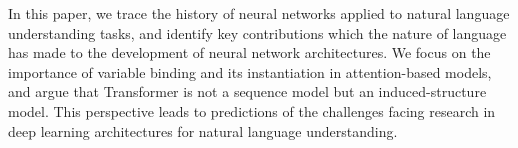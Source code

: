 In this paper, we trace the history of neural networks applied to natural language understanding tasks, and identify key contributions which the nature of language has made to the development of neural network architectures.  We focus on the importance of variable binding and its instantiation in attention-based models, and argue that Transformer is not a sequence model but an induced-structure model.  This perspective leads to predictions of the challenges facing research in deep learning architectures for natural language understanding.
